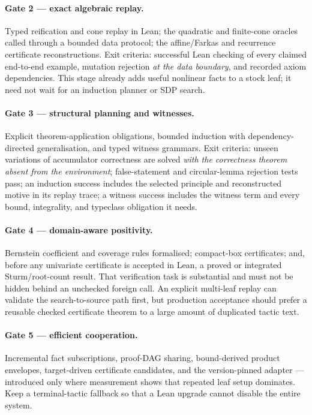 \paragraph{Gate 2 --- exact algebraic replay.}
Typed reification and cone replay in Lean; the quadratic and finite-cone oracles
called through a bounded data protocol; the affine/Farkas and recurrence
certificate reconstructions. Exit criteria: successful Lean checking of every
claimed end-to-end example, mutation rejection \emph{at the data boundary}, and
recorded axiom dependencies. This stage already adds useful nonlinear facts to a
stock \grind{} leaf; it need not wait for an induction planner or SDP search.

\paragraph{Gate 3 --- structural planning and witnesses.}
Explicit theorem-application obligations, bounded induction with
dependency-directed generalisation, and typed witness grammars. Exit criteria:
unseen variations of accumulator correctness are solved \emph{with the
correctness theorem absent from the environment}; false-statement and
circular-lemma rejection tests pass; an induction success includes the selected
principle and reconstructed motive in its replay trace; a witness success
includes the witness term and every bound, integrality, and typeclass obligation
it needs.

\paragraph{Gate 4 --- domain-aware positivity.}
Bernstein coefficient and coverage rules formalised; compact-box certificates;
and, before any univariate certificate is accepted in Lean, a proved or
integrated Sturm/root-count result. That verification task is substantial and
must not be hidden behind an unchecked foreign call. An explicit multi-leaf
replay can validate the search-to-source path first, but production acceptance
should prefer a reusable checked certificate theorem to a large amount of
duplicated tactic text.

\paragraph{Gate 5 --- efficient cooperation.}
Incremental fact subscriptions, proof-DAG sharing, bound-derived product
envelopes, target-driven certificate candidates, and the version-pinned adapter
--- introduced only where measurement shows that repeated leaf setup dominates.
Keep a terminal-tactic fallback so that a Lean upgrade cannot disable the entire
system.


